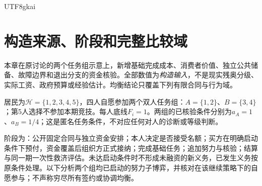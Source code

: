 \documentclass[12pt,a4paper,openany]{report}
\newcommand{\HH}{\mathcal H}
\begin{document}
\begin{CJK*}{UTF8}{gkai}
\section{构造来源、阶段和完整比较域}
本章在原讨论的两个任务组示意上，新增基础完成成本、消费者价值、独立公共储备、故障边界和退出分支的资金核验。全部数值为\emph{构造输入}，不是现实残奥分级、实际工资、政府预算或经验估计。均衡结论只覆盖下列有限合同与行为域。

居民为$\HH=\{1,2,3,4,5\}$，四人自愿参加两个双人任务组：$A=\{1,2\}$、$B=\{3,4\}$；第5人选择不参加本期竞技。每人底线$F_i=1$。两组的已核验条件分别为$a_A=1$、$a_B=1/4$；这是匿名任务条件，不对应任何对人的诊断或等级判断。

阶段为：公开固定合同与独立资金安排；本人决定是否接受名额；买方在明确启动条件下预付，资金覆盖后组织方正式接纳；完成基础任务；追加努力与核验；结算与同一期一次性救济评估。未达启动条件时不形成未融资的新义务，已发生义务按原条件处理。以下分析两个组均已启动的努力子博弈，并核对在该继续策略下的自愿参与；不声称穷尽所有签约或协调均衡。


\end{CJK*}
\end{document}
